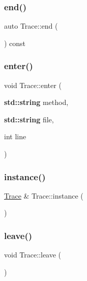 \mbox{\label{class_trace_aaeba765b0abb18e1d45d1580b82e8fb4}} 
\subsubsection{\texorpdfstring{end()}{end()}}
{\footnotesize\ttfamily auto Trace\+::end (\begin{DoxyParamCaption}{ }\end{DoxyParamCaption}) const\hspace{0.3cm}{\ttfamily [inline]}}

\mbox{\label{class_trace_a61142361cf22f613055bf7a74c3d4ecf}} 
\subsubsection{\texorpdfstring{enter()}{enter()}}
{\footnotesize\ttfamily void Trace\+::enter (\begin{DoxyParamCaption}\item[{\textbf{ std\+::string}}]{method,  }\item[{\textbf{ std\+::string}}]{file,  }\item[{int}]{line }\end{DoxyParamCaption})}

\mbox{\label{class_trace_a60d1c997d646ffd36310ffd79dd08b14}} 
\subsubsection{\texorpdfstring{instance()}{instance()}}
{\footnotesize\ttfamily \hyperlink{class_trace}{Trace} \& Trace\+::instance (\begin{DoxyParamCaption}{ }\end{DoxyParamCaption})\hspace{0.3cm}{\ttfamily [static]}}

\mbox{\label{class_trace_ad8d6fe43bf7fc6d770d317da87557b42}} 
\subsubsection{\texorpdfstring{leave()}{leave()}}
{\footnotesize\ttfamily void Trace\+::leave (\begin{DoxyParamCaption}{ }\end{DoxyParamCaption})}

